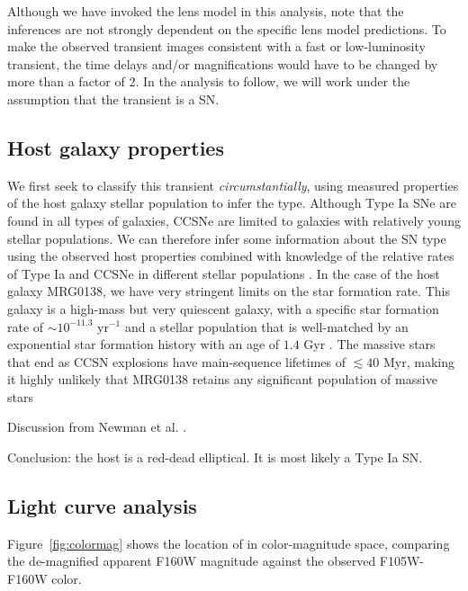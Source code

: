 \documentclass[twocolumn]{aastex63}
\begin{document}
Although we have invoked the lens model in this analysis, note that the inferences are not strongly dependent on the specific lens model predictions.  To make the observed transient images consistent with a fast or low-luminosity transient, the time delays and/or magnifications would have to be changed by more than a factor of 2.  In the analysis to follow, we will work under the assumption that the transient is a SN. 

\subsection{Host galaxy properties}
\label{ss:host}

We first seek to classify this transient {\it circumstantially}, using measured properties of the host galaxy stellar population to infer the type. Although Type Ia SNe are found in all types of galaxies, CCSNe are limited to galaxies with relatively young stellar populations.  We can therefore infer some information about the SN type using the observed host properties combined with knowledge of the relative rates of Type Ia and CCSNe in different stellar populations \citep{mannucci_rates_2005,foley_classifying_2013}.  In the case of the host galaxy MRG0138, we have very stringent limits on the star formation rate. This galaxy is a high-mass but very quiescent galaxy, with a specific star formation rate of $\sim10^{-11.3}$ yr$^{-1}$  and a stellar population that is well-matched by an exponential star formation history with an age of $1.4$ Gyr \cite{newman_resolving_2018}.  The massive stars that end as CCSN explosions have main-sequence lifetimes of $\lesssim 40$ Myr,  making it highly unlikely that MRG0138 retains any significant population of massive stars 


Discussion from Newman et al. \citep{newman_resolving_2018-1}.

Conclusion: the host is a red-dead elliptical. It is most likely a Type Ia SN.

\subsection{Light curve analysis}
\label{ss:lightcurve}

Figure~\ref{fig:colormag} shows the location of \SNABC in color-magnitude space, comparing the de-magnified apparent F160W magnitude against the observed F105W-F160W color.  
\end{document}

